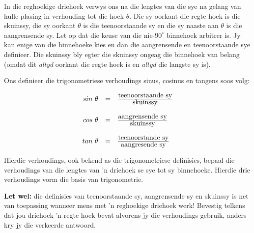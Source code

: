 

In die reghoekige driehoek verwys ons na die lengtes van die sye na gelang van hulle plasing in verhouding tot die hoek $\theta $. Die sy oorkant die regte hoek is die skuinssy, die sy oorkant $\theta $ is die teenoorstaande sy en die sy naaste aan $\theta $ is die aangrensende sy.
Let op dat die keuse van die nie-$90^{\circ}$ binnehoek arbitrer is. Jy kan enige van die binnehoeke kies en dan die aangrensende en teenoorstaande sye definieer. Die skuinssy bly egter die skuinssy ongeag die binnehoek van belang (omdat dit \textit{altyd} oorkant die regte hoek is en \textit{altyd} die langste sy is).

Ons definieer die trigonometriese verhoudings sinus, cosinus en tangens soos volg:


\begin{equation*}
\begin{array}{ccc}\hfill sin~\theta & =& \frac{\mbox{teenoorstaande sy}}{\mbox{skuinssy}}\hfill \\
\\
 \hfill cos~\theta & =& \frac{\mbox{aangrensende sy}}{\mbox{skuinssy}}\hfill \\
\\
 \hfill tan~\theta & =& \frac{\mbox{teenoorstande sy}}{\mbox{aangresende sy}}\hfill 
\end{array}
\end{equation*}

Hierdie verhoudings, ook bekend as die trigonometriese definisies, bepaal die verhoudings van die lengtes van 'n driehoek se sye tot sy binnehoeke. 
Hierdie drie verhoudings vorm die basis van trigonometrie. \par

\textbf{Let wel: }die definisies van teenoorstaande sy, aangrensende sy en skuinssy is net van toepassing wanneer mens met 'n reghoekige driehoek werk! Bevestig telkens dat jou driehoek 'n regte hoek bevat alvorens jy die verhoudings gebruik, anders kry jy die verkeerde antwoord.



